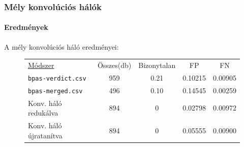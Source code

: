 \documentclass[11pt]{beamer}
\begin{document}
\begin{frame}
	\frametitle{Mély konvolúciós hálók}
	\framesubtitle{Eredmények}

	A mély konvolúciós háló eredményei:
	
	\begin{figure} [h!]
		\centering
		\begin{tabular}{ l c c c c  }
			\underline{Módszer} 			& Összes(db) 	& Bizonytalan	& FP	& FN \\
			\texttt{bpas-verdict.csv} 	& 959 			& 0.21			& 0.10215 	& 0.00905 	\\
			\texttt{bpas-merged.csv}  	& 496			& 0.10			& 0.14545 	& 0.00259   \\
			
			\hline
			Konv. háló redukálva\footnotemark 	& 894			& 0				& 0.02798	& 0.00972	\\
			Konv. háló újratanítva& 894			& 0				& 0.05555	& 0.00900	\\
			
			
		\end{tabular} 
		
	\end{figure}

\end{frame}
\end{document}
